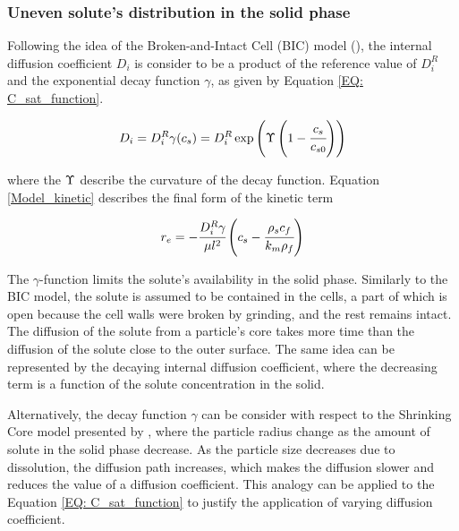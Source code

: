 \documentclass[../Article_Model_Parameters.tex]{subfiles}
\begin{document}
	
	\subsubsection{Uneven solute's distribution in the solid phase} \label{CH: Gamma_Function}
	
	Following the idea of the Broken-and-Intact Cell (BIC) model (\citet{Sovova2017}), the internal diffusion coefficient $D_i$ is consider to be a product of the reference value of $D_i^R$ and the exponential decay function $\gamma$, as given by Equation \ref{EQ: C_sat_function}.
	
	{\footnotesize
		\begin{equation}
			D_i = D_i^R \gamma(c_s) = D_i^R \exp \left( \Upsilon \left( 1-\cfrac{ c_s }{c_{s0}} \right) \right) \label{EQ: C_sat_function}
	\end{equation} }
	
	where the ${\color{black}\Upsilon}$ describe the curvature of the decay function. Equation \ref{Model_kinetic} describes the final form of the kinetic term
	
	{\footnotesize
		\begin{equation}
			\label{Model_kinetic}
			r_e = -\cfrac{D_i^R \gamma }{ \mu l^2 } \left( c_s  - \cfrac{\rho_s c_f }{ k_m \rho_f }  \right)
	\end{equation} }
	
	The $\gamma$-function limits the solute's availability in the solid phase. Similarly to the BIC model, the solute is assumed to be contained in the cells, a part of which is open because the cell walls were broken by grinding, and the rest remains intact. The diffusion of the solute from a particle's core takes more time than the diffusion of the solute close to the outer surface. The same idea can be represented by the decaying internal diffusion coefficient, where the decreasing term is a function of the solute concentration in the solid. 
	
	Alternatively, the decay function $\gamma$ can be consider with respect to the Shrinking Core model presented by \citet{Goto1996}, where the particle radius change as the amount of solute in the solid phase decrease. As the particle size decreases due to dissolution, the diffusion path increases, which makes the diffusion slower and reduces the value of a diffusion coefficient. This analogy can be applied to the Equation \ref{EQ: C_sat_function} to justify the application of varying diffusion coefficient.
	
\end{document}
